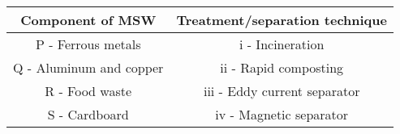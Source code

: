 \begin{tabular}{|c|c|}
\hline
\textbf{Component of MSW} & \textbf{Treatment/separation technique} \\
\hline
P - Ferrous metals & i - Incineration \\
Q - Aluminum and copper & ii - Rapid composting \\
R - Food waste & iii - Eddy current separator \\
S - Cardboard & iv - Magnetic separator \\
\hline
\end{tabular}  